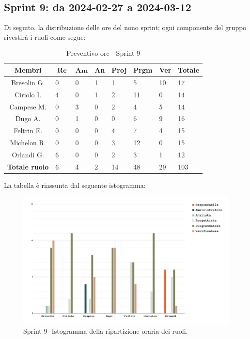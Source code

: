 \documentclass[10pt, a4paper]{article}
\begin{document}
\subsection{Sprint 9: da 2024-02-27 a 2024-03-12}
Di seguito, la distribuzione delle ore del nono sprint; ogni componente del gruppo rivestirà i ruoli come segue:
\begin{table}[H]
\begin{tabularx}{\textwidth}{c|X|X|X|X|X|X|X}
    \textbf{Membri} & $\operatorname{\textbf{Re}}$ & $\mathrm{\textbf{Am}}$ & \textbf{An} & \textbf{Proj} & \textbf{Prgm} & \textbf{Ver} & \textbf{Totale} \\
        \hline Bresolin G. & 0 & 0 & 1 & 1 & 5 & \cellcolor{primarycolor}10 & 17 \\
        \hline Ciriolo I.  & 4 & 0 & 1 & 2 & \cellcolor{primarycolor}11 & 0 & 14 \\
        \hline Campese M.  & 0 & 3 & 0 & 2 & \cellcolor{primarycolor}4 & 5 & 14 \\
        \hline Dugo A.     & 0 & 1 & 0 & 0 & 6 & \cellcolor{primarycolor}9 & 16 \\
        \hline Feltrin E.  & 0 & 0 & 0 & \cellcolor{primarycolor}4 & 7 & 4 & 15 \\
        \hline Michelon R. & 0 & 0 & 0 & 3 & \cellcolor{primarycolor}12 & 0 & 15 \\
        \hline Orlandi G.  & \cellcolor{primarycolor}6 & 0 & 0 & 2 & 3 & 1 & 12 \\
        \hline
        \textbf{Totale ruolo} & 6 & 4 & 2 & 14 & 48 & 29 & 103 
    \end{tabularx}
    \caption{Preventivo ore - Sprint 9}
    \end{table}

La tabella è riassunta dal seguente istogramma:
 \begin{figure}[H]
        \centering        
        \includegraphics[width=15.5cm]{istogrammi/istogramma_9_periodo.png}
        \caption{Sprint 9- Istogramma della ripartizione oraria dei ruoli. }
    \end{figure}
\end{document}
